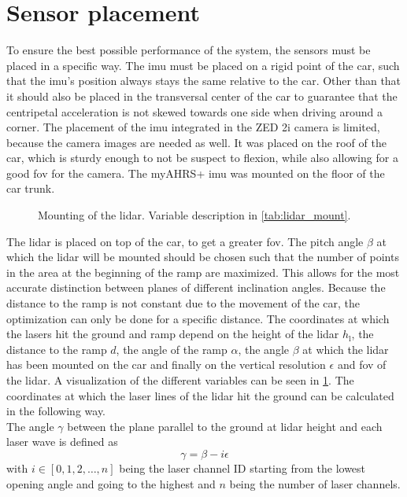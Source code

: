 \section{Sensor placement}
To ensure the best possible performance of the system, the sensors must be placed in a specific way.
The \gls{imu} must be placed on a rigid point of the car, such that the \gls{imu}'s position always stays the same relative to the car.
Other than that it should also be placed in the transversal center of the car to guarantee that the centripetal acceleration is not skewed towards one side when driving around a corner.
The placement of the \gls{imu} integrated in the ZED 2i camera is limited, because the camera images are needed as well.
It was placed on the roof of the car, which is sturdy enough to not be suspect to flexion, while also allowing for a good \gls{fov} for the camera.
The myAHRS+ \gls{imu} was mounted on the floor of the car trunk.\\
\begin{figure}[htpb]
	\centering
	
	\caption{Mounting of the \acrshort{lidar}. Variable description in \cref{tab:lidar_mount}.}
	\label{fig:tikz_lidar_mount}
\end{figure}
The \gls{lidar} is placed on top of the car, to get a greater \gls{fov}.
The pitch angle $\beta$ at which the \gls{lidar} will be mounted should be chosen such that the number of points in the area at the beginning of the ramp are maximized.
This allows for the most accurate distinction between planes of different inclination angles.
Because the distance to the ramp is not constant due to the movement of the car, the optimization can only be done for a specific distance.
The coordinates at which the lasers hit the ground and ramp depend on the height of the \gls{lidar} $h_\mathrm{l}$, the distance to the ramp $d$, the angle of the ramp $\alpha$, the angle $\beta$ at which the \gls{lidar} has been mounted on the car and finally on the vertical resolution $\epsilon$ and \gls{fov} of the \gls{lidar}.
A visualization of the different variables can be seen in \cref{fig:tikz_lidar_mount}.
The coordinates at which the laser lines of the \gls{lidar} hit the ground can be calculated in the following way.\\
The angle $\gamma$ between the plane parallel to the ground at \gls{lidar} height and each laser wave is defined as
\begin{equation}
	\gamma = \beta - i\epsilon
\end{equation}
with $i \in [0,1,2,\dots,n]$ being the laser channel ID starting from the lowest opening angle and going to the highest and $n$ being the number of laser channels.
